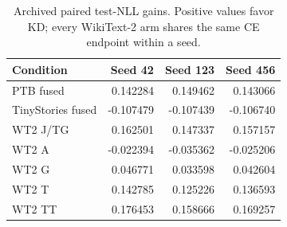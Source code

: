 \begingroup\small
\setlength{\tabcolsep}{5pt}
\begin{table}[htbp]\centering
\begin{tabular}{lrrr}
\toprule
Condition & Seed 42 & Seed 123 & Seed 456 \\
\midrule
PTB fused & 0.142284 & 0.149462 & 0.143066 \\
TinyStories fused & -0.107479 & -0.107439 & -0.106740 \\
WT2 J/TG & 0.162501 & 0.147337 & 0.157157 \\
WT2 A & -0.022394 & -0.035362 & -0.025206 \\
WT2 G & 0.046771 & 0.033598 & 0.042604 \\
WT2 T & 0.142785 & 0.125226 & 0.136593 \\
WT2 TT & 0.176453 & 0.158666 & 0.169257 \\
\bottomrule
\end{tabular}
\caption{Archived paired test-NLL gains. Positive values favor KD; every WikiText-2 arm shares the same CE endpoint within a seed.}\label{tab:per_seed_gains}
\end{table}
\endgroup
